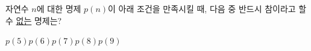 \hspace*{2mm}\begin{minipage}[t]{\dimexpr\linewidth-2mm\relax}\vspace{0pt}
자연수 $n$에 대한 명제 $p(n)$이 아래 조건을 만족시킬 때, 다음 중 반드시 참이라고 할 수 \underline{없는} 명제는? 
\begin{choices32}{$p(5)$}{$p(6)$}{$p(7)$}{$p(8)$}{$p(9)$}\end{choices32}\end{minipage}
